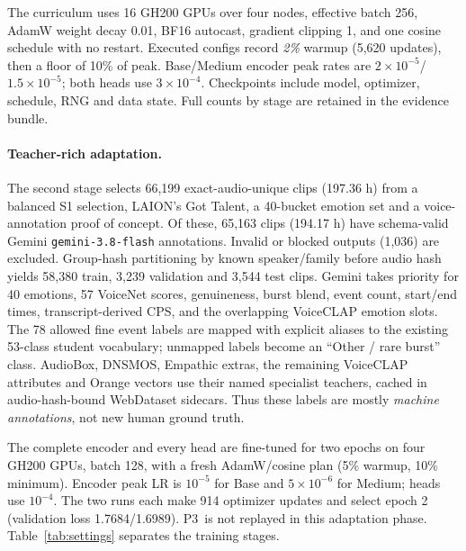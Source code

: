 \documentclass{article}
\newcommand{\pthree}{\textsc{P3}}
\begin{document}
The curriculum uses 16 GH200 GPUs over four nodes, effective batch 256, AdamW weight decay 0.01, BF16 autocast, gradient clipping 1, and one cosine schedule with no restart. Executed configs record \emph{2\%} warmup (5,620 updates), then a floor of 10\% of peak. Base/Medium encoder peak rates are $2\times10^{-5}$/$1.5\times10^{-5}$; both heads use $3\times10^{-4}$. Checkpoints include model, optimizer, schedule, RNG and data state. Full counts by stage are retained in the evidence bundle.

\paragraph{Teacher-rich adaptation.}
The second stage selects 66,199 exact-audio-unique clips (197.36 h) from a balanced S1 selection, LAION's Got Talent, a 40-bucket emotion set and a voice-annotation proof of concept. Of these, 65,163 clips (194.17 h) have schema-valid Gemini \texttt{gemini-3.8-flash} annotations. Invalid or blocked outputs (1,036) are excluded. Group-hash partitioning by known speaker/family before audio hash yields 58,380 train, 3,239 validation and 3,544 test clips. Gemini takes priority for 40 emotions, 57 VoiceNet scores, genuineness, burst blend, event count, start/end times, transcript-derived CPS, and the overlapping VoiceCLAP emotion slots. The 78 allowed fine event labels are mapped with explicit aliases to the existing 53-class student vocabulary; unmapped labels become an ``Other / rare burst'' class. AudioBox, DNSMOS, Empathic extras, the remaining VoiceCLAP attributes and Orange vectors use their named specialist teachers, cached in audio-hash-bound WebDataset sidecars. Thus these labels are mostly \emph{machine annotations}, not new human ground truth.

The complete encoder and every head are fine-tuned for two epochs on four GH200 GPUs, batch 128, with a fresh AdamW/cosine plan (5\% warmup, 10\% minimum). Encoder peak LR is $10^{-5}$ for Base and $5\times10^{-6}$ for Medium; heads use $10^{-4}$. The two runs each make 914 optimizer updates and select epoch 2 (validation loss 1.7684/1.6989). \pthree\ is not replayed in this adaptation phase. Table~\ref{tab:settings} separates the training stages.
\end{document}
